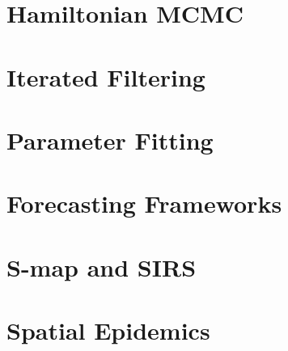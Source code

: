 \documentclass[12pt]{report}
\makeatletter
\let\org@subfile
\renewcommand*{}[1]{%
  \filename@parse{#1}%
  \expandafter
  \graphicspath\expandafter{\expandafter{\filename@area}}%
  \org@subfile{#1}%
}
\makeatother
\begin{document}
\begin{linenumbers}
		
	
	
	\nocite{*}
	\printbibliography


	\appendix

	\chapter{Hamiltonian MCMC}

		

	\chapter{Iterated Filtering}

		

	\chapter{Parameter Fitting}

		

	\chapter{Forecasting Frameworks}

		

	\chapter{S-map and SIRS}

		

	\chapter{Spatial Epidemics}

		

		


	\end{linenumbers}
	
\end{document}
